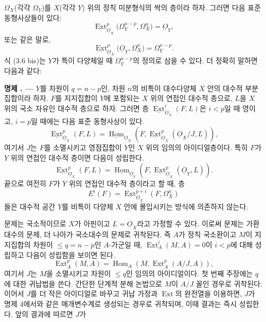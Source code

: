 \documentclass[11pt,twoside,openany]{book}
\numberwithin{equation}{section}
\newcommand{\sourceunit}{front}
\newcommand{\src}[1]{%
  \phantomsection\hypertarget{src:\sourceunit:#1}{}%
  \marginpar{\raggedleft\footnotesize\sffamily #1}%
}
\newcommand{\Osh}{\underline{O}}
\newcommand{\Homsh}{\underline{\operatorname{Hom}}}
\newcommand{\Extsh}{\underline{\operatorname{Ext}}}
\newcommand{\fquote}[1]{\textquotedbl#1\textquotedbl}
\theoremstyle{plain}
\theoremstyle{definition}
\theoremstyle{remark}
\newcommand{\result}[2]{%
  \par\medskip\noindent\textbf{#1%
  \if\relax\detokenize{#2}\relax\else\space#2\fi. ---}\enspace
}
\begin{document}
\src{176}
$\Omega_X$(각각 $\Omega_Y$)를 $X$(각각 $Y$) 위의 정칙
미분형식의 싹의 층이라 하자. 그러면 다음 표준 동형사상들이
있다:
\begin{equation}\tag{3.6}
  \Extsh_{\Osh_X}^{p}\bigl(\Omega_Y^{n-p},\Omega_X^{n}\bigr)=\Osh_Y,
\end{equation}
또는 같은 말로,
\begin{equation}\tag{3.6 bis}
  \Extsh_{\Osh_X}^{p}\bigl(\Osh_Y,\Omega_X^{n}\bigr)=\Omega_Y^{n-p}.
\end{equation}
식 (3.6 bis)는 $Y$가 특이 다양체일 때 $\Omega_Y^{n-p}$의 정의로
삼을 수 있다. 더 정확히 말하면 다음과 같다:

\result{명제}{5} $Y$를 차원이 $q=n-p$인, 차원 $n$의 비특이
대수다양체 $X$ 안의 대수적 부분집합이라 하자. $F$를 지지집합이
$Y$에 포함되는 $X$ 위의 연접인 대수적 층으로, $L$을 $X$ 위의
국소 자유인 대수적 층으로 하자. 그러면 층
$\Extsh_{\Osh_X}^{i}(F,L)$은 $i<p$일 때 영이고, $i=p$일 때에는 다음
표준 동형사상이 있다.
\begin{equation}\tag{3.7}
  \Extsh_{\Osh_X}^{p}(F,L)
  =\Homsh_{\Osh_X}\!\left(F,
  \Extsh_{\Osh_X}^{p}(\Osh_X/J,L)\right),
\end{equation}
여기서 $J$는 $F$를 소멸시키고 영점집합이 $Y$인 $X$ 위의 임의의
아이디얼층이다. 특히 $F$가 $Y$ 위의 연접인 대수적 층이면 다음이 성립한다.
\begin{equation}\tag{3.7 bis}
  \Extsh_{\Osh_X}^{p}(F,L)
  =\Homsh_{\Osh_Y}\!\left(F,\Extsh_{\Osh_X}^{p}(\Osh_Y,L)\right).
\end{equation}
끝으로 여전히 $F$가 $Y$ 위의 연접인 대수적 층이라고 할 때, 층
\[
  E^{i}(F)=\Extsh_{\Osh_X}^{p+i}(F,\Omega_X^{n})
\]
들은 대수적 공간 $Y$를 비특이 다양체 $X$ 안에 몰입시키는 방식에
의존하지 않는다.

문제는 국소적이므로 $X$가 아핀이고 $L=\Osh_X$라고 가정할 수 있다.
이로써 문제는 가환대수의 문제, 더 나아가 국소대수의 문제로 귀착된다. 즉
$A$가 정칙 국소환이고 $M$이 지지집합의 차원이
$\leq q=n-p$인 $A$-가군일 때, $\operatorname{Ext}_{A}^{i}(M,A)=0$이 $i<p$에 대해 성립하고 다음이 성립함을 보이면 된다.
\[
  \operatorname{Ext}_{A}^{p}(M,A)
  =\operatorname{Hom}_{A}\!\left(M,\operatorname{Ext}_{A}^{p}(A/J,A)\right),
\]
여기서 $J$는 $M$을 소멸시키고 \fquote{차원}이 $\leq q$인 임의의 아이디얼이다.
첫 번째 주장에는 $q$에 대한 귀납법을 쓴다. 간단한 단계적 분해 논법으로
$M$이 $A/J$ 꼴인 경우로 귀착된다. 이어서 $J$를 더 작은 아이디얼로
바꾸고 귀납 가정과 $\operatorname{Ext}$의 완전열을 이용하면, $J$가
명제 4에서와 같은 \fquote{매개변수계}로 생성되는 경우로 귀착되며, 이때 결과는 즉시 성립한다. 앞의 결과에 따르면 $J$가
\end{document}
